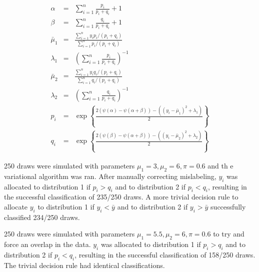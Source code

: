 \documentclass[12pt]{article}
\begin{document}
\begin{eqnarray*}
\alpha & = & \sum_{i=1}^{n} \frac{p_i}{p_i+q_i} + 1 \\
\beta & = & \sum_{i=1}^{n} \frac{q_i}{p_i+q_i} + 1 \\
\bar{\mu}_1 & = &  \frac{\sum_{i=1}^{n} y_i p_i /(p_i+q_i)}{\sum_{i=1}^{n} p_i /(p_i+q_i)} \\
\lambda_1 & = & \left(\sum_{i=1}^{n} \frac{p_i}{p_i+q_i}\right)^{-1} \\
\bar{\mu}_2 & = &  \frac{\sum_{i=1}^{n} y_i q_i /(p_i+q_i)}{\sum_{i=1}^{n} q_i /(p_i+q_i)} \\
\lambda_2 & = & \left(\sum_{i=1}^{n} \frac{q_i}{p_i+q_i}\right)^{-1} \\
p_i & = & \exp \left\{\frac{2(\psi(\alpha)-\psi(\alpha+\beta))-((y_i - \bar{\mu}_1)^2 + \lambda_1)}{2} \right\} \\
q_i & = & \exp \left\{\frac{2(\psi(\beta)-\psi(\alpha+\beta))-((y_i - \bar{\mu}_2)^2 + \lambda_2)}{2} \right\}
\end{eqnarray*}

250 draws were simulated with parameters $\mu_1 = 3, \mu_2 = 6, \pi=0.6$ and th e variational algorithm was ran. After manually correcting mislabeling, $y_i$ was allocated to distribution 1 if $p_i > q_i$ and to distribution 2 if $p_i < q_i$, resulting in the successful classification of 235/250 draws. A more trivial decision rule to allocate $y_i$ to distribution 1 if $y_i < \bar{y}$ and to distribution 2 if $y_i > \bar{y}$ successfully classified 234/250 draws.

250 draws were simulated with parameters $\mu_1 = 5.5, \mu_2 = 6, \pi=0.6$ to try and force an overlap in the data. $y_i$ was allocated to distribution 1 if $p_i > q_i$ and to distribution 2 if $p_i < q_i$, resulting in the successful classification of 158/250 draws. The trivial decision rule had identical classifications.
\end{document}
